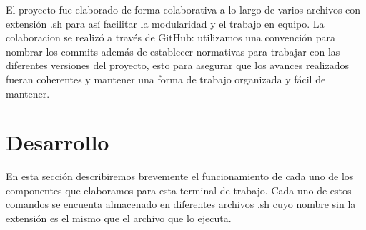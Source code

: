 \documentclass[12pt,a4paper]{article}
\begin{document}
\noindent
El proyecto fue elaborado de forma colaborativa a lo largo de varios archivos con extensión .sh para así facilitar la modularidad y el trabajo en equipo. La colaboracion se realizó a través de GitHub: utilizamos una convención para nombrar los commits además de establecer normativas para trabajar con las diferentes versiones del proyecto, esto para asegurar que los avances realizados fueran coherentes y mantener una forma de trabajo organizada y fácil de mantener.
\section{Desarrollo}
\justifying
\noindent
En esta sección describiremos brevemente el funcionamiento de cada uno de los componentes que elaboramos para esta terminal de trabajo. Cada uno de estos comandos se encuenta almacenado en diferentes archivos .sh cuyo nombre sin la extensión es el mismo que el archivo que lo ejecuta.
\end{document}
